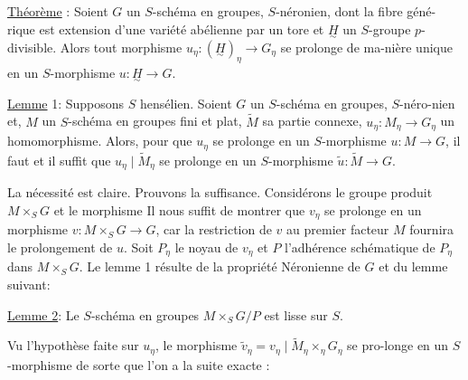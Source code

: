 \uline{Théorème} : Soient $G$ un $S$-schéma en groupes, $S$-néronien, \inserted{[}dont la fibre géné-rique est extension d'une variété abélienne par un tore\inserted{]} et $\underset{\sim}{H}$ un $S$-groupe $p$-divisible. Alors tout morphisme $u_\eta:(\underset{\sim}{H})_\eta\longrightarrow G_\eta$ se prolonge de ma-nière unique en un $S$-morphisme $u:\underset{\sim}{H}\longrightarrow G$.

\uline{Lemme} 1: Supposons $S$ hensélien. Soient $G$ un $S$-schéma en groupes, $S$-néro-nien et, $M$ un $S$-schéma en groupes fini et plat, $\widetilde M$ sa partie connexe,  $u_\eta:M_\eta\longrightarrow G_\eta$ un homomorphisme. Alors, pour que $u_\eta$ se prolonge en un $S$-morphisme $u:M\longrightarrow G$, il faut et il suffit que $u_\eta\mid\widetilde M_\eta$ se prolonge en un $S$-morphisme $\widetilde u:\widetilde M\longrightarrow G$.

La nécessité est claire. Prouvons la suffisance. Considérons le groupe produit $M\times_SG$ et le morphisme
Il nous suffit de montrer que $v_\eta$ se prolonge en un morphisme $v:M\times_SG\longrightarrow G$, car la restriction de $v$ au premier facteur $M$ fournira le prolongement de $u$. Soit $P_\eta$ le noyau de $v_\eta$ et $P$ l'adhérence schématique de $P_\eta$ dans $M\times_SG$. Le lemme 1 résulte de la propriété Néronienne de $G$ et du lemme suivant:

\uline{Lemme 2}: Le $S$-schéma en groupes $M\times_SG/P$  est lisse sur $S$.

Vu l'hypothèse faite sur $u_\eta$, le morphisme $\widetilde v_\eta=v_\eta\mid\widetilde M_\eta\times_\eta G_\eta$ se pro-longe en un $S$-morphisme
de sorte que l'on a la suite exacte :

